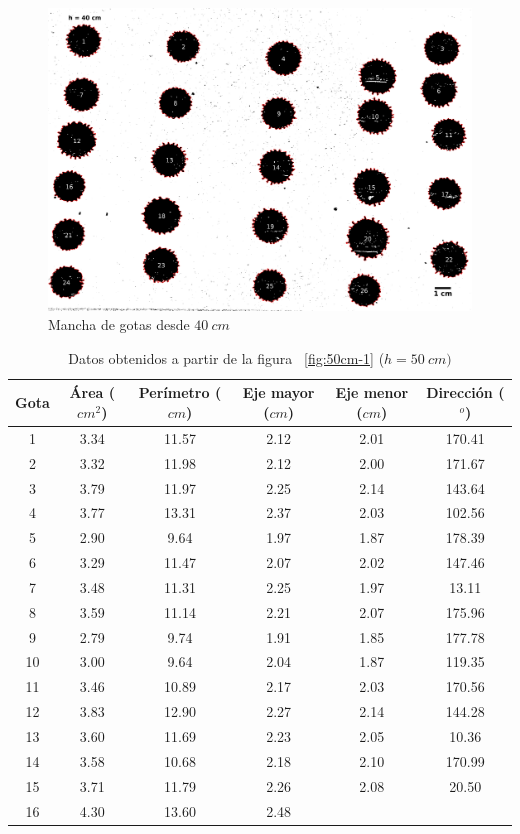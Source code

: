 \begin{figure}[H] \centering
\includegraphics[width=0.60\linewidth]{src/40-1.png} \caption{Mancha de gotas
desde $40\ cm$} \label{fig:40cm-1} \end{figure}

\begin{table}[H] \centering \caption{Datos obtenidos a partir de la figura
    ~\ref{fig:50cm-1} ($h=50\ cm)$} \label{tab:50cm} \begin{tabular}{cccccc}
        \toprule Gota & Área ($cm^2$) & Perímetro ($cm$) & Eje mayor ($cm$) &
        Eje menor ($cm$) & Dirección ($^o$) \\ \midrule 1  & 3.34 & 11.57 &
        2.12 & 2.01 & 170.41 \\ 2  & 3.32 & 11.98 & 2.12 & 2.00 & 171.67 \\ 3
             & 3.79 & 11.97 & 2.25 & 2.14 & 143.64 \\ 4  & 3.77 & 13.31 & 2.37
             & 2.03 & 102.56 \\ 5  & 2.90 & 9.64  & 1.97 & 1.87 & 178.39 \\ 6
             & 3.29 & 11.47 & 2.07 & 2.02 & 147.46 \\ 7  & 3.48 & 11.31 & 2.25
             & 1.97 & 13.11  \\ 8  & 3.59 & 11.14 & 2.21 & 2.07 & 175.96 \\ 9
             & 2.79 & 9.74  & 1.91 & 1.85 & 177.78 \\ 10 & 3.00 & 9.64  & 2.04
             & 1.87 & 119.35 \\ 11 & 3.46 & 10.89 & 2.17 & 2.03 & 170.56 \\ 12
             & 3.83 & 12.90 & 2.27 & 2.14 & 144.28 \\ 13 & 3.60 & 11.69 & 2.23
             & 2.05 & 10.36  \\ 14 & 3.58 & 10.68 & 2.18 & 2.10 & 170.99 \\ 15
             & 3.71 & 11.79 & 2.26 & 2.08 & 20.50  \\ 16 & 4.30 & 13.60 & 2.48

\end{tabular}
\end{table}
